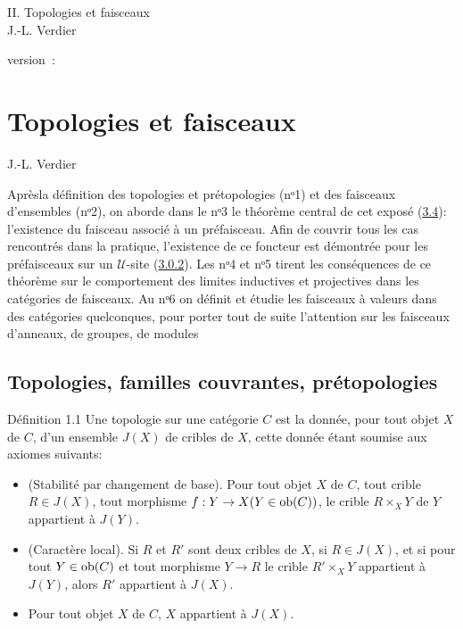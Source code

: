 \documentclass[10pt]{../fichiers-configuration-latex/smfart}
\begin{document}
\begin{center}
II. Topologies et faisceaux\\
J.-L. Verdier
\end{center}

version : \showgitstatus{}
\tableofcontents

\else
\chapter{Topologies et faisceaux}
\begin{center}
J.-L. Verdier
\end{center}
\fi

Après\pageoriginale la définition des topologies et
prétopologies (nᵒ1) et des faisceaux d'ensembles
(nᵒ2), on aborde dans le nᵒ3 le
théorème central de cet exposé (\hyperref[II.theo3.4]{3.4}): l'existence
du faisceau associé à un préfaisceau. Afin de couvrir tous les
cas rencontrés dans la pratique, l'existence de ce foncteur est
démontrée pour les préfaisceaux sur un $𝒰$-site
(\hyperref[II.def3.0.2]{3.0.2}). Les nᵒ4 et nᵒ5
tirent les conséquences de ce théorème sur le comportement des
limites inductives et projectives dans les catégories de
faisceaux. Au nᵒ6 on définit et étudie les
faisceaux à valeurs dans des catégories quelconques, pour porter
tout de suite l'attention sur les faisceaux d'anneaux, de groupes,
de modules \etcn

\section{Topologies, familles couvrantes,
  prétopologies}

\begin{enonce*}{Définition 1.1}
Une topologie sur une catégorie $C$ est la donnée, pour tout
objet $X$ de $C$, d'un ensemble $J(X)$ de cribles de $X$, cette
donnée étant soumise aux axiomes suivants:
\begin{itemize}
\item[T 1)] {\rm{(Stabilité par changement de base).}} Pour tout
  objet $X$ de $C$, tout crible $R\in J(X)$, tout morphisme
  $f:Y\rightarrow X(Y\in \operatorname{ob} (C))$, le crible $R\times_X Y$ de $Y$
  appartient à $J(Y)$.

\item[T 2)] {\rm(Caractère local).} Si $R$ et $R'$ sont deux
  cribles de $X$, si $R\in J(X)$, et si pour tout $Y\in \operatorname{ob} (C)$ et
  tout morphisme $Y\rightarrow R$ le crible $R'\times_X Y$
  appartient\pageoriginale
  à $J(Y)$, alors $R'$ appartient à $J(X)$.

\item[T 3)] Pour tout objet $X$ de $C$, $X$ appartient à $J(X)$.
\end{itemize}
\end{enonce*}
\end{document}
